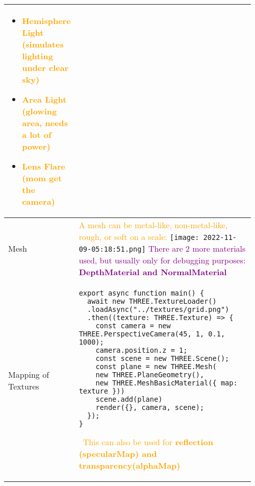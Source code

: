 \documentclass[main.tex,fontsize=8pt,paper=a4,paper=portrait,DIV=calc,]{scrartcl}
\begin{document}
\begin{table}[ht!]
\begin{tabular}{|m{0.2\linewidth}|m{0.755\linewidth}|}
\begin{itemize}
\item \textcolor{orange}{Hemisphere Light (simulates lighting under clear sky)}
\item \textcolor{orange}{Area Light (glowing area, needs a lot of power)}
\item \textcolor{orange}{Lens Flare (mom get the camera)}
\vspace{-3mm}
\end{itemize}\\
\hline
Mesh & 
\textcolor{orange}{A mesh can be metal-like, non-metal-like, rough, or soft on a scale:}\newline
\texttt{[image: 2022-11-09-05:18:51.png]}\newline
\textcolor{purple}{There are 2 more materials used, but usually only for debugging purposes:\newline
\textbf{DepthMaterial and NormalMaterial}}\\
\hline
Mapping of Textures & 
\begin{lstlisting}
export async function main() {
  await new THREE.TextureLoader()
  .loadAsync("../textures/grid.png")
  .then((texture: THREE.Texture) => {
    const camera = new THREE.PerspectiveCamera(45, 1, 0.1, 1000);
    camera.position.z = 1;
    const scene = new THREE.Scene();
    const plane = new THREE.Mesh(
    new THREE.PlaneGeometry(),
    new THREE.MeshBasicMaterial({ map: texture }))
    scene.add(plane)
    render({}, camera, scene);
  });
}
\end{lstlisting} 
\, \newline
\textcolor{orange}{This can also be used for \textbf{reflection (specularMap) and transparency(alphaMap)}}\\
\hline
\end{tabular}
\end{table}
\pagebreak
\end{document}
